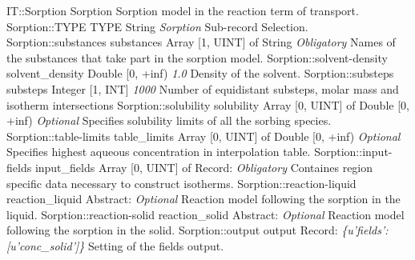 \begin{RecordType}
	{IT::Sorption}
	{Sorption}
	{} %
	{} %
	{{{Sorption model in the reaction term of transport.}}}
		\RecKey
			{Sorption::TYPE}
			{TYPE}
			{{String}}
			{ \it{Sorption} }
			{{{Sub-record Selection.}}}
		\RecKey
			{Sorption::substances}
			{substances}
			{{Array [1, UINT] of }{String}}
			{ \it{Obligatory} }
			{{{Names of the substances that take part in the sorption model.}}}
		\RecKey
			{Sorption::solvent-density}
			{solvent{\_}density}
			{{Double [0, +inf)}}
			{ \it{1.0} }
			{{{Density of the solvent.}}}
		\RecKey
			{Sorption::substeps}
			{substeps}
			{{Integer [1, INT]}}
			{ \it{1000} }
			{{{Number of equidistant substeps, molar mass and isotherm intersections}}}
		\RecKey
			{Sorption::solubility}
			{solubility}
			{{Array [0, UINT] of }{Double [0, +inf)}}
			{ \it{Optional} }
			{{{Specifies solubility limits of all the sorbing species.}}}
		\RecKey
			{Sorption::table-limits}
			{table{\_}limits}
			{{Array [0, UINT] of }{Double [0, +inf)}}
			{ \it{Optional} }
			{{{Specifies highest aqueous concentration in interpolation table.}}}
		\RecKey
			{Sorption::input-fields}
			{input{\_}fields}
			{{Array [0, UINT] of }{Record}{: }}
			{ \it{Obligatory} }
			{{{Containes region specific data necessary to construct isotherms.}}}
		\RecKey
			{Sorption::reaction-liquid}
			{reaction{\_}liquid}
			{{Abstract}{: }}
			{ \it{Optional} }
			{{{Reaction model following the sorption in the liquid.}}}
		\RecKey
			{Sorption::reaction-solid}
			{reaction{\_}solid}
			{{Abstract}{: }}
			{ \it{Optional} }
			{{{Reaction model following the sorption in the solid.}}}
		\RecKey
			{Sorption::output}
			{output}
			{{Record}{: }}
			{ \it{{\{}u'fields': [u'conc{\_}solid']{\}}} }
			{{{Setting of the fields output.}}}
\end{RecordType}
